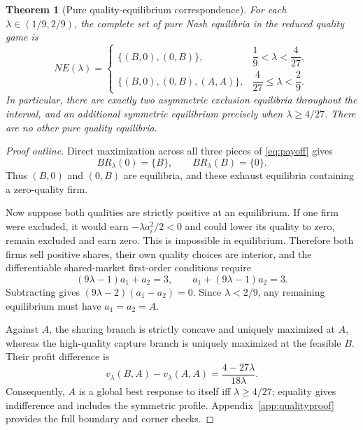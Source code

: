 \documentclass[11pt]{article}
\newtheorem{theorem}{Theorem}
\begin{document}
\begin{theorem}[Pure quality-equilibrium correspondence]
\label{thm:complete}
For each $\lambda\in(1/9,2/9)$, the complete set
of pure Nash equilibria in the reduced quality game is
\begin{equation}\label{eq:NE}
NE(\lambda)=
\begin{cases}
\{(B,0),(0,B)\},&
  \dfrac19<\lambda<\dfrac4{27},\\[5pt]
\{(B,0),(0,B),(A,A)\},&
  \dfrac4{27}\leq\lambda<\dfrac29.
\end{cases}
\end{equation}
In particular, there are exactly two
asymmetric exclusion equilibria throughout
the interval, and an additional symmetric
equilibrium precisely when $\lambda\geq4/27$.
There are no other pure quality equilibria.
\end{theorem}

\begin{proof}[Proof outline]
Direct maximization across all three pieces
of \eqref{eq:payoff} gives
\begin{equation}\label{eq:cornerBR}
BR_\lambda(0)=\{B\},\qquad
BR_\lambda(B)=\{0\}.
\end{equation}
Thus $(B,0)$ and $(0,B)$ are equilibria,
and these exhaust equilibria containing
a zero-quality firm.

Now suppose both qualities are strictly positive
at an equilibrium. If one firm were excluded,
it would earn $-\lambda a_i^2/2<0$ and could
lower its quality to zero, remain excluded
and earn zero. This is impossible in equilibrium.
Therefore both firms sell positive shares,
their own quality choices are interior,
and the differentiable shared-market first-order
conditions require
\begin{equation}\label{eq:FOC}
(9\lambda-1)a_1+a_2=3,\qquad
a_1+(9\lambda-1)a_2=3.
\end{equation}
Subtracting gives
$(9\lambda-2)(a_1-a_2)=0$. Since
$\lambda<2/9$, any remaining equilibrium
must have $a_1=a_2=A$.

Against $A$, the sharing branch is strictly
concave and uniquely maximized at $A$,
whereas the high-quality capture branch
is uniquely maximized at the feasible $B$.
Their profit difference is
\begin{equation}\label{eq:gain}
v_\lambda(B,A)-v_\lambda(A,A)
=\frac{4-27\lambda}{18\lambda}.
\end{equation}
Consequently, $A$ is a global best response
to itself iff $\lambda\geq4/27$; equality
gives indifference and includes the symmetric
profile. Appendix~\ref{app:qualityproof}
provides the full boundary and corner checks.
\end{proof}
\end{document}
